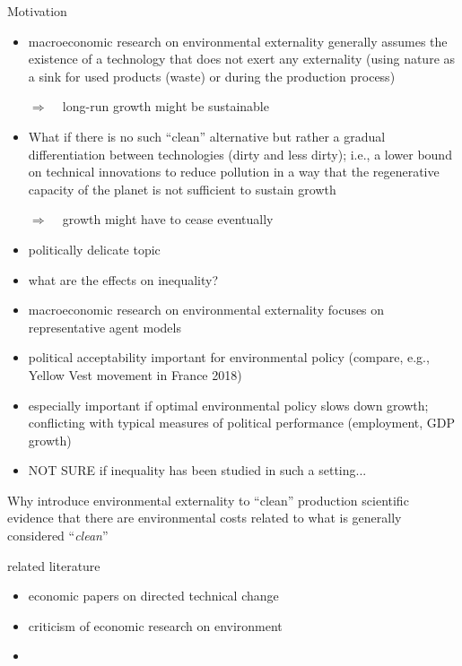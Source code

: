 \documentclass[11pt,aspectratio=169]{beamer}
\newcommand{\ar}{$\Rightarrow$ \ }
\begin{document}
\begin{frame}[allowframebreaks]{Motivation}
\begin{itemize}
\item macroeconomic research on environmental externality generally assumes the existence of a technology that does not exert any externality (using nature as a sink for used products (waste) or during the production process)
\item[\ar] long-run growth might be sustainable \citep{Acemoglu2012TheChange}
\item What if there is no such ``clean'' alternative but rather a gradual differentiation between technologies (dirty and less dirty); i.e., a lower bound on technical  innovations to reduce pollution in a way that the regenerative capacity of the planet is not  sufficient to sustain growth
\item[\ar] growth might have to cease eventually
\item politically delicate topic
\item what are the effects on inequality?

\item macroeconomic research on environmental externality focuses on representative agent models \citep{Golosov2014OptimalEquilibrium, Barrage2019OptimalPolicy, Acemoglu2012TheChange}
\item political acceptability important for environmental policy (compare, e.g., Yellow Vest movement in France 2018)
\item especially important if optimal environmental policy slows down growth; conflicting with typical measures of political performance (employment, GDP growth)
\item NOT SURE if inequality has been studied in such a setting...
\end{itemize}
\end{frame}

\begin{frame}{Why introduce environmental externality to ``clean'' production}
scientific evidence that there are environmental costs related to what is generally considered ``\textit{clean}''
\end{frame}

\begin{frame}{related literature}
\begin{itemize}
\item economic papers on directed technical change
\item criticism of economic research on environment
\item 
\end{itemize}
\end{frame}
\end{document}
